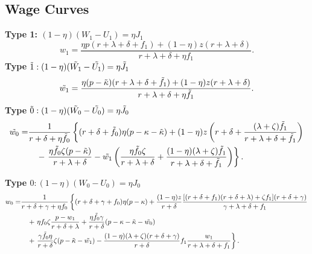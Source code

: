 \documentclass[12pt]{article} %
\theoremstyle{definition}
\begin{document}
\subsection*{Wage Curves}\label{regain wage curves} 
\textbf{Type 1: $(1-\eta)(W_1-U_1) = \eta J_1$}
\begin{equation}
 w_1 = \frac{\eta p (r+\lambda+\delta+f_1)+(1-\eta)z(r+\lambda+\delta)}{r+\lambda+\delta + \eta f_1}. \label{eq WC 1}
 \end{equation}
 \textbf{Type $\Tilde{1}: (1-\eta)(\Tilde{W_1}-\Tilde{U_1}) = \eta \Tilde{J_1}$}
\begin{equation}
\Tilde{w_1} = \frac{\eta (p-\Tilde{\kappa}) (r+\lambda+\delta+\Tilde{f_1})+(1-\eta)z(r+\lambda+\delta)}{r+\lambda+\delta + \eta \Tilde{f_1}}. \label{eq WC1 tilde}
\end{equation}
\textbf{Type $\Tilde{0}: (1-\eta)(\Tilde{W_0}-\Tilde{U_0}) = \eta \Tilde{J_0}$}
\begin{equation}
\begin{aligned}
    \Tilde{w_0} = 
    & \frac{1}{r+\delta+\eta \Tilde{f_0}}\left\{ 
        (r+\delta+\Tilde{f_0})\eta(p-\kappa-\Tilde{\kappa}) + (1-\eta)z \left(r+\delta+\frac{(\lambda+\zeta)\Tilde{f_1}}{r+\lambda+\delta+\Tilde{f_1}}\right) \right. \\
    & \quad - \left. \frac{\eta \Tilde{f_0} \zeta (p-\Tilde{\kappa})}{r+\lambda+\delta} - \Tilde{w_1}\left(\frac{\eta \Tilde{f_0} \zeta}{r+\lambda+\delta} + \frac{(1-\eta)(\lambda+\zeta)\Tilde{f_1}}{r+\lambda+\delta+\Tilde{f_1}}\right)
      \right\}.
\end{aligned}
\end{equation}

\textbf{Type $0: (1-\eta)(W_0-U_0) = \eta J_0$}
\begin{equation}
\begin{aligned}
    w_0 = 
    & \frac{1}{r+\delta+\gamma+\eta f_0}\left\{ 
        (r+\delta+\gamma+f_0)\eta(p-\kappa) + \frac{(1-\eta)z}{r+\delta} \frac{[(r+\delta+f_1)(r+\delta+\lambda)+\zeta f_1](r+\delta + \gamma)}{\gamma+\lambda+\delta+f_1}  \right. \\
    & \quad + \left. \eta f_0 \zeta \frac{p-w_1}{r+\delta+\lambda} + \frac{\eta \Tilde{f_0} \gamma}{r+\delta} (p-\kappa-\Tilde{\kappa}-\Tilde{w_0}) \right. \\
    & \quad + \left. \frac{\gamma \Tilde{f_0} \eta}{r+\delta} \zeta (p-\Tilde{\kappa} - \Tilde{w_1}) - \frac{(1-\eta)(\lambda+\zeta)(r+\delta+\gamma)}{r+\delta} f_1 \frac{w_1}{r+\lambda+\delta+f_1}
      \right\}.
\end{aligned}
\end{equation}
\end{document}

